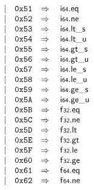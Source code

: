 $$\begin{array}[t]{@{}lrrl@{}l@{}l@{}l@{}}
& & | & \mathtt{0x51} & \quad\Rightarrow\quad{} & \mathsf{i{\scriptstyle 64}} {.} \mathsf{eq} \\
& & | & \mathtt{0x52} & \quad\Rightarrow\quad{} & \mathsf{i{\scriptstyle 64}} {.} \mathsf{ne} \\
& & | & \mathtt{0x53} & \quad\Rightarrow\quad{} & \mathsf{i{\scriptstyle 64}} {.} {\mathsf{lt}}{\mathsf{\_}}{\mathsf{s}} \\
& & | & \mathtt{0x54} & \quad\Rightarrow\quad{} & \mathsf{i{\scriptstyle 64}} {.} {\mathsf{lt}}{\mathsf{\_}}{\mathsf{u}} \\
& & | & \mathtt{0x55} & \quad\Rightarrow\quad{} & \mathsf{i{\scriptstyle 64}} {.} {\mathsf{gt}}{\mathsf{\_}}{\mathsf{s}} \\
& & | & \mathtt{0x56} & \quad\Rightarrow\quad{} & \mathsf{i{\scriptstyle 64}} {.} {\mathsf{gt}}{\mathsf{\_}}{\mathsf{u}} \\
& & | & \mathtt{0x57} & \quad\Rightarrow\quad{} & \mathsf{i{\scriptstyle 64}} {.} {\mathsf{le}}{\mathsf{\_}}{\mathsf{s}} \\
& & | & \mathtt{0x58} & \quad\Rightarrow\quad{} & \mathsf{i{\scriptstyle 64}} {.} {\mathsf{le}}{\mathsf{\_}}{\mathsf{u}} \\
& & | & \mathtt{0x59} & \quad\Rightarrow\quad{} & \mathsf{i{\scriptstyle 64}} {.} {\mathsf{ge}}{\mathsf{\_}}{\mathsf{s}} \\
& & | & \mathtt{0x5A} & \quad\Rightarrow\quad{} & \mathsf{i{\scriptstyle 64}} {.} {\mathsf{ge}}{\mathsf{\_}}{\mathsf{u}} \\
& & | & \mathtt{0x5B} & \quad\Rightarrow\quad{} & \mathsf{f{\scriptstyle 32}} {.} \mathsf{eq} \\
& & | & \mathtt{0x5C} & \quad\Rightarrow\quad{} & \mathsf{f{\scriptstyle 32}} {.} \mathsf{ne} \\
& & | & \mathtt{0x5D} & \quad\Rightarrow\quad{} & \mathsf{f{\scriptstyle 32}} {.} \mathsf{lt} \\
& & | & \mathtt{0x5E} & \quad\Rightarrow\quad{} & \mathsf{f{\scriptstyle 32}} {.} \mathsf{gt} \\
& & | & \mathtt{0x5F} & \quad\Rightarrow\quad{} & \mathsf{f{\scriptstyle 32}} {.} \mathsf{le} \\
& & | & \mathtt{0x60} & \quad\Rightarrow\quad{} & \mathsf{f{\scriptstyle 32}} {.} \mathsf{ge} \\
& & | & \mathtt{0x61} & \quad\Rightarrow\quad{} & \mathsf{f{\scriptstyle 64}} {.} \mathsf{eq} \\
& & | & \mathtt{0x62} & \quad\Rightarrow\quad{} & \mathsf{f{\scriptstyle 64}} {.} \mathsf{ne} \\

\end{array}$$
